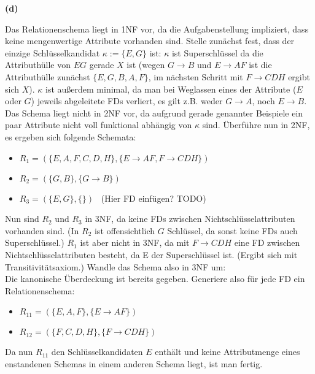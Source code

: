 \documentclass[11pt, a4paper]{article}
\newcommand{\rA}{\rightarrow}
\newcommand{\aufgabenteil}[1] {\textbf{(#1)}}
\begin{document}
\aufgabenteil{d}
\begin{adjustwidth}{20pt}{20pt}
	Das Relationenschema liegt in 1NF vor, da die Aufgabenstellung impliziert, dass keine mengenwertige Attribute vorhanden sind. Stelle
	zunächst fest, dass der einzige Schlüsselkandidat $\kappa := \{ E,G\}$ ist: $\kappa$ ist Superschlüssel da die Attributhülle von $EG$ gerade $X$ ist (wegen $G \rA B$ und
	$E \rA AF$ ist die Attributhülle zunächst $\{ E,G, B, A, F\}$, im nächsten Schritt mit $F \rA CDH$ ergibt sich $X$). $\kappa$ ist außerdem minimal, da man bei Weglassen
	eines der Attribute ($E$ oder $G$) jeweils abgeleitete FDs verliert, es gilt z.B. weder $G \rA A$, noch $E \rA B$.\\
	Das Schema liegt nicht in 2NF vor, da aufgrund gerade genannter Beispiele ein paar Attribute nicht voll funktional abhängig von $\kappa$ sind. Überführe nun in 2NF,
	es ergeben sich folgende Schemata:
	\begin{itemize}
	\item $R_1=(\{ E,A,F,C,D,H\}, \{ E \rA AF, F \rA CDH\})$
	\item $R_2=(\{ G,B\}, \{ G \rA B\})$
	\item $R_3=(\{ E,G\}, \{\})$ \ (Hier FD einfügen? TODO)
	\end{itemize}
	Nun sind $R_2$ und $R_3$ in 3NF, da keine FDs zwischen Nichtschlüsselattributen vorhanden sind. (In $R_2$ ist offensichtlich $G$ Schlüssel, da sonst keine FDs auch Superschlüssel.)
	$R_1$ ist aber nicht in 3NF, da mit $F \rA CDH$ eine FD zwischen Nichtschlüsselattributen besteht, da E der Superschlüssel ist. (Ergibt sich mit Transitivitätsaxiom.)
	Wandle das Schema also in 3NF um:\\
	Die kanonische Überdeckung ist bereits gegeben. Generiere also für jede FD ein Relationenschema:
	\begin{itemize}
	\item $R_{11} = (\{ E,A,F\}, \{ E \rA AF\})$
	\item $R_{12} = (\{ F,C,D,H\}, \{ F \rA CDH\})$
	\end{itemize}
	Da nun $R_{11}$ den Schlüsselkandidaten $E$ enthält und keine Attributmenge eines enstandenen Schemas in einem anderen Schema liegt, ist man fertig.
\end{adjustwidth}
\end{document}

